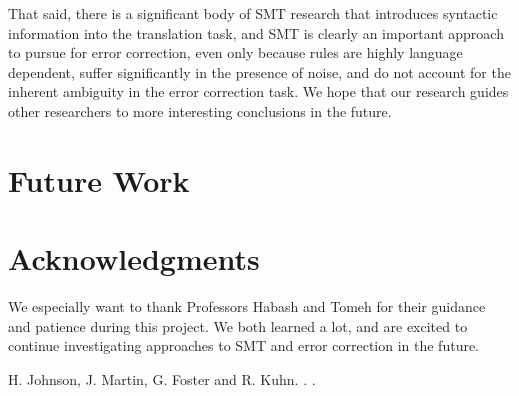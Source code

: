 \documentclass[11pt,letterpaper]{article}
\begin{document}
That said, there is a significant body of SMT research that introduces syntactic information into the translation task, and SMT is clearly an important approach to pursue for error correction, even only because rules are highly language dependent, suffer significantly in the presence of noise, and do not account for the inherent ambiguity in the error correction task. We hope that our research guides other researchers to more interesting conclusions in the future.

\section{Future Work}

\section*{Acknowledgments}

We especially want to thank Professors Habash and Tomeh for their guidance and patience during this project. We both learned a lot, and are excited to continue investigating approaches to SMT and error correction in the future.


\begin{thebibliography}{}

H. Johnson, J. Martin, G. Foster and R. Kuhn.
.
.

\end{thebibliography}
\end{document}
